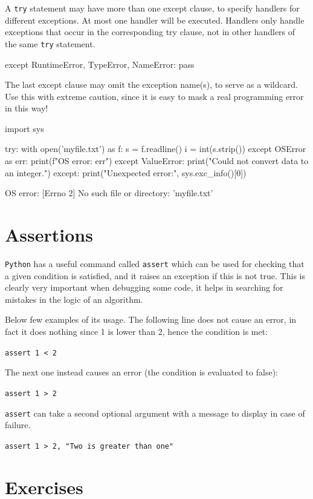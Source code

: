 A \texttt{try} statement may have more than one except clause, to specify handlers for different exceptions. At most one handler will be executed. Handlers only handle exceptions that occur in the corresponding try clause, not in other handlers of the same \texttt{try} statement.

\begin{ipythonnon}
except RuntimeError, TypeError, NameError:
    pass	
\end{ipythonnon}

The last except clause may omit the exception name(s), to serve as a wildcard. Use this with extreme caution, since it is easy to mask a real programming error in this way! 

\begin{ipythonnon}
import sys 

try:
    with open('myfile.txt') as f: 
        s = f.readline()
        i = int(s.strip()) 
except OSError as err:
    print(f"OS error: {err}") 
except ValueError:
    print("Could not convert data to an integer.") 
except:
    print("Unexpected error:", sys.exc_info()[0])
\end{ipythonnon}
\begin{ioutput}
OS error: [Errno 2] No such file or directory: 'myfile.txt'	
\end{ioutput}

\section{Assertions}
\texttt{Python} has a useful command called \texttt{assert} which can be used for checking that a given condition is satisfied, and it raises an exception if this is not true. This is clearly very important when debugging some code, it helps in searching for mistakes in the logic of an algorithm.

Below few examples of its usage. The following line does not cause an error, in fact it does nothing since 1 is lower than 2, hence the condition is met:

\lstinline[language=iPython]|assert 1 < 2|

\noindent
The next one instead causes an error (the condition is evaluated to false): 

\lstinline[language=iPython]|assert 1 > 2|

\noindent
\texttt{assert} can take a second optional argument with a message to display in case of failure.

\lstinline[language=iPython]|assert 1 > 2, "Two is greater than one"|

\section*{Exercises}

